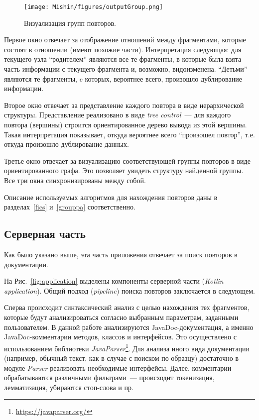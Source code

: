 \begin{figure}[h!]
    \centering
    \texttt{[image: Mishin/figures/outputGroup.png]}
    \caption{Визуализация групп повторов.}\label{fig:groupViz}
\end{figure}


Первое окно отвечает за отображение отношений между фрагментами, которые состоят в отношении (имеют похожие части).
Интерпретация следующая: для текущего узла ``родителем'' являются все те фрагменты, в которые была взята часть информации с текущего фрагмента и, возможно, видоизменена.
``Детьми'' являются те фрагменты, c которых, вероятнее всего, произошло дублирование информации.

Второе окно отвечает за представление каждого повтора в виде иерархической структуры.
Представление реализовано в виде \emph{tree control}~--- для каждого повтора (вершины) строится ориентированное дерево вывода из этой вершины.
Такая интерпретация показывает, откуда вероятнее всего ``произошел повтор'', т.е. откуда произошло дублирование данных.

Третье окно отвечает за визуализацию соответствующей группы повторов в  виде ориентированного графа.
Это позволяет увидеть структуру найденной группы. Все три окна синхронизированы между собой.

Описание используемых алгоритмов для нахождения повторов даны в разделах~\ref{fics} и~\ref{grouppa}  соответственно.    



\subsection{Серверная часть}\label{server}
Как было указано выше, эта часть приложения отвечает за поиск повторов в документации.

На Рис.~\ref{fig:application} выделены компоненты серверной части (\emph{Kotlin application}).
Общий подход (\emph{pipeline}) поиска повторов заключается в следующем.

Сперва происходит синтаксический анализ с целью нахождения тех фрагментов, которые будут анализироваться согласно выбранным параметрам, заданными пользователем.
В данной работе анализируются JavaDoc-документация, а именно JavaDoc-комментарии методов, классов и интерфейсов.
Это осуществлено с использованием библиотеки \emph{JavaParser}\footnote{\url{https://javaparser.org/}}.
Для анализа иного вида документации (например, обычный текст, как в случае с поиском по образцу) достаточно в модуле \emph{Parser} реализовать необходимые интерфейсы.
Далее, комментарии обрабатываются различными фильтрами~--- происходит токенизация, лемматизация, убираются стоп-слова и пр.


